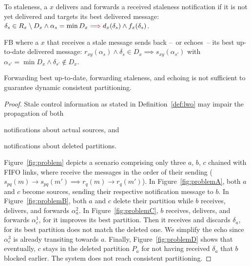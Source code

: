 

\begin{definition}
  To \NAMEB staleness, a \process $x$ delivers and forwards a received
  staleness notification if it is not yet delivered and targets its
  best delivered message: $\delta_s \in R_x \setminus D_x \wedge
  \alpha_s = \min D_x \textcolor{red}{\implies} d_x(\delta_s) \wedge
  f_x(\delta_s)$.
\end{definition}

\begin{definition} FB where a
  \process $x$ that receives a stale message sends back --~or
  echoes~-- its best up-to-date delivered message: $r_{xy}(\alpha_s)
  \wedge \delta_s \in D_x \implies s_{xy}(\alpha_{s'})$ with
  $\alpha_{s'} = \min D_x \wedge \delta_{s'} \not\in D_x$.
\end{definition}

\begin{lemma}
  Forwarding best up-to-date, forwarding staleness, and echoing is not
  sufficient to guarantee dynamic consistent partitioning.
\end{lemma}

\begin{proof}
Stale control information as stated in Definition~\ref{def:lwo} may
impair the propagation of both
\begin{inparaenum}[(i)]
\item notifications about actual sources, and
\item notifications about deleted partitions.
\end{inparaenum}
Figure~\ref{fig:problem} depicts a scenario comprising only three
\processes $a$, $b$, $c$ chained with FIFO links, \ie where \processes
receive the messages in the order of their sending ($s_{pq}(m)
\rightarrow s_{pq}(m') \implies r_q(m) \rightarrow r_q(m')$). In
Figure~\ref{fig:problemA}, both $a$ and $c$ become sources, sending
their respective notification message to $b$. In
Figure~\ref{fig:problemB}, both $a$ and $c$ delete their partition
while $b$ receives, delivers, and forwards $\alpha_a^2$. In
Figure~\ref{fig:problemC}, $b$ receives, delivers, and forwards
$\alpha_c^1$, for it improves its best partition. Then it receives and
discards $\delta_a$, for its best partition does not match the deleted
one. We simplify the echo since $\alpha_c^3$ is already transiting
towards $a$. Finally, Figure~\ref{fig:problemD} shows that eventually,
$c$ stays in the deleted partition $P_a$ for not having received
$\delta_a$ that $b$ blocked earlier. The system does not reach
consistent partitioning. \end{proof}

